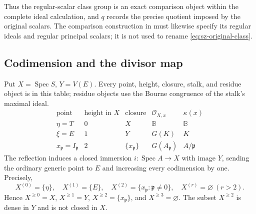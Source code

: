 Thus the regular-scalar class group is an exact comparison object
within the complete ideal calculation, and \(q\) records the precise
quotient imposed by the original scalars. The comparison construction
in \cite[\texttt{cor:dedekind-preservation}]{support} must likewise
specify its regular ideals and regular principal scalars; it is not
used to rename \eqref{eq:sz-original-class}.

\subsection{Codimension and the divisor map}

\begin{theorem}\label{thm:sz-codimension}
Put \(X=\operatorname{Spec}S\), \(Y=V(E)\).
Every point, height, closure, stalk, and residue object is in this table;
residue objects use the Bourne congruence of the stalk's maximal ideal.
\[
\begin{array}{c|c|c|c|c}
\text{point}&\text{height in }X&\text{closure}&\mathcal O_{X,x}&\kappa(x)\\ \hline
\eta=T&0&X&\mathbb B&\mathbb B\\
\xi=E&1&Y&G(K)&K\\
x_{\mathfrak p}=I_{\mathfrak p}&2&\{x_{\mathfrak p}\}
 &G(A_{\mathfrak p})&A/\mathfrak p
\end{array}
\]
The reflection induces a closed immersion
\(i:\operatorname{Spec}A\to X\) with image \(Y\), sending the ordinary
generic point to \(E\) and increasing every codimension by one.
Precisely,
\begin{equation}\label{eq:sz-codim-filtration}
 X^{(0)}=\{\eta\},\quad X^{(1)}=\{E\},\quad
 X^{(2)}=\{x_{\mathfrak p}:\mathfrak p\ne0\},\quad
 X^{(r)}=\varnothing\ (r>2).
\end{equation}
Hence \(X^{\ge0}=X\), \(X^{\ge1}=Y\),
\(X^{\ge2}=\{x_{\mathfrak p}\}\), and \(X^{\ge3}=\varnothing\).
The subset \(X^{\ge2}\) is dense in \(Y\) and is not closed in \(X\).
\end{theorem}

